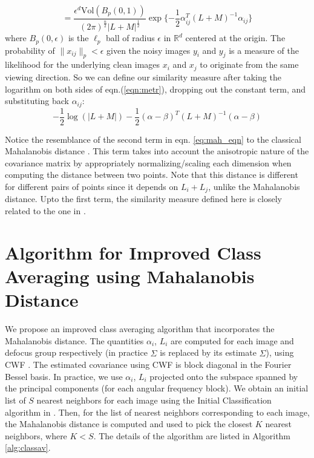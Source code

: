 \documentclass{article}
\begin{document}
\begin{equation}
= \frac{\epsilon^d \text{Vol}(B_p(0,1)) }{(2 \pi)^{\frac{n}{2}} |L + M|^{\frac{1}{2}}} \exp\{-\frac{1}{2}\alpha_{ij}^T(L+M)^{-1}\alpha_{ij}\} 
\label{eqn:metr}
\end{equation}
where $B_p(0,\epsilon)$ is the $\ell_p$ ball of radius $\epsilon$ in $\mathbb{R}^d$ centered at the origin. The probability of $\|x_{ij}\|_p < \epsilon$ given the noisy images $y_i$ and $y_j$  is a measure of the likelihood for the underlying clean images $x_i$ and $x_j$ to originate from the same viewing direction. So we can define our similarity measure after taking the logarithm on both sides of eqn.(\ref{eqn:metr}), dropping out the constant term, and substituting back $\alpha_{ij}$:
\begin{equation}\label{eq:mah_eqn}
 -\frac{1}{2}\log(|L + M|) -\frac{1}{2}(\alpha - \beta)^T(L+M)^{-1}(\alpha -\beta)
\end{equation}

Notice the resemblance of the second term in eqn. \ref{eq:mah_eqn} to the classical Mahalanobis distance \cite{mah}. This term takes into account the anisotropic nature of the covariance matrix by appropriately normalizing/scaling each dimension when computing the distance between two points. Note that this distance is different for different pairs of points since it depends on $L_i + L_j$, unlike the Mahalanobis distance. Upto the first term, the similarity measure defined here is closely related to the one in \cite{nlica}. 

\section{Algorithm for Improved Class Averaging using Mahalanobis Distance}

We propose an improved class averaging algorithm that incorporates the Mahalanobis distance. The quantities $\alpha_i$, $L_i$ are computed for each image and defocus group respectively (in practice $\Sigma$ is replaced by its estimate $\hat{\Sigma}$), using CWF \cite{cwf}. The estimated covariance using CWF is block diagonal in the Fourier Bessel basis. In practice, we use $\alpha_i$, $L_i$ projected onto the subspace spanned by the principal components (for each angular frequency block). We obtain an initial list of $S$ nearest neighbors for each image using the Initial Classification algorithm in \cite{zhao}. Then, for the list of nearest neighbors corresponding to each image, the Mahalanobis distance is computed and used to pick the closest $K$ nearest neighbors, where $K<S$. The details of the algorithm are listed in Algorithm \ref{alg:classav}. 
\end{document}
